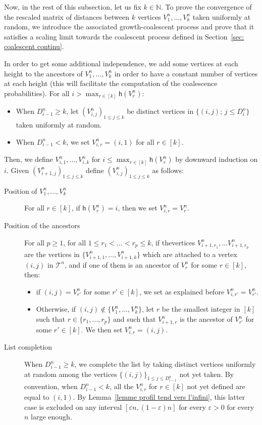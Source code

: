 \documentclass[10pt]{amsart}
\theoremstyle{definition}\newtheorem{defi}[theo]{Definition}\newtheorem{rema}[theo]{Remark}\newtheorem{exam}[theo]{Example}\newtheorem{exem}[theo]{Example}\newtheorem{nota}[theo]{Notation}
\newcommand{\e}{\varepsilon}
\newcommand{\N}{\mathbb{N}}
\newcommand{\1}{\mathbbm{1}}
\newcommand{\T}{\mathcal{T}}
\newcommand{\h}{\mathsf{h}}
\begin{document}
Now, {in the rest of this subsection, let us fix $k \in \N$}. To prove the convergence of the rescaled matrix of distances between $k$ vertices $V^n_1,\dots, V^n_k$ taken uniformly at random, we introduce the associated growth-coalescent process and prove that it satisfies a scaling limit towards the coalescent process defined in Section~\ref{sec: coalescent continu}.

In order to get some additional independence, we add some vertices at each height to the ancestors of $V^n_1,\dots, V^n_k$ in order to have a constant number of vertices at each height {(this will facilitate the computation of the coalescence probabilities)}. For all $i> \max_{r \in [k]} \h(V^n_r)$:
\begin{itemize}
\item When $D^n_{i-1} \ge k$, let $(V^n_{i,j})_{1\leq j \leq k}$ be distinct vertices in $\{ (i,j); \, j \le D^n_i \}$ taken uniformly at random.
\item When $D^n_{i-1} < k$, we set $V^n_{i,r} = (i, 1)$ for all $r \in [k]$.
\end{itemize}
Then, we define $V^n_{i,1}, \dots, V^n_{i,k}$ for $i \le \max_{r \in [k]} \h(V^n_r)$ by downward induction on $i$. Given $(V^n_{i+1,j})_{1\leq j \leq k}$ define $(V^n_{i,j})_{1\leq j \leq k}$ as follows:
\begin{description}
\item[Position of $V^n_{1},\dots, V^n_k$] For all $r \in [k]$, if $\h(V^n_r) = i$, then we set $V^n_{i,r}= V^n_r$.
\item[Position of the ancestors] For all $p \ge 1$, for all $1 \le r_1 < \dots <r_p \le k$, if the\linebreak ver\-tices $V^n_{i+1, r_1}, \dots V^n_{i+1,r_p}$ are the vertices in $\{V^n_{i+1,1}, \dots, V^n_{i+1,k} \}$ which are attached to a vertex $(i,j)$ in $\T^n$, and if one of them is an ancestor of $V^n_r$ for some $r \in [k]$, then:
\begin{itemize}
\item if $(i,j) = V^n_{r'}$ for some $r' \in [k]$, we set as explained before $V^n_{i,r'} = V^n_{r'}$.
\item Otherwise, if $(i,j) \not \in \{V_1^n, \dots, V^n_k\}$, let $r$ be the smallest integer in $[k]$ such that $r \in \{r_1, \dots, r_p \}$ and such that $V^n_{i+1,r}$ is the ancestor of $V^n_{r'}$ for some $r' \in [k]$. We then set $V^n_{i,r} = (i,j)$.
\end{itemize}
\item[List completion] When $D^n_{i-1} \ge k$, we complete the list by taking distinct vertices uniformly at random among the vertices $\{(i,j)\}_{1\leq j\leq D^n_{i-1}}$ not yet taken. By convention, when $D^n_{i-1} <k$, all the $V^n_{i,r}$ for $r \in [k]$ not yet defined are equal to $(i,1)$. By Lemma~\ref{lemme profil tend vers l'infini}, this latter case is excluded on any interval $[\e n, (1-\e)n]$ for every $\e>0$ for every $n$ large enough.
\end{description}
\end{document}

